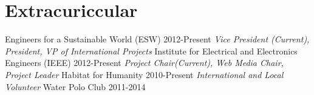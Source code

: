 \documentclass[]{friggeri-cv} %
\begin{document}
\vspace{-8pt}
\section{Extracuriccular}

\begin{entrylist}
\entry
{Engineers for a Sustainable World (ESW)}
{2012-Present}
{}
{\emph{Vice President (Current), President, VP of International Projects}}
{}
\entry
{Institute for Electrical and Electronics Engineers  (IEEE)}
{2012-Present}
{}
{\emph{Project Chair(Current), Web Media Chair, Project Leader}}
{}
\entry
{Habitat for Humanity}
{2010-Present}
{}
{\emph{International and Local Volunteer}}
{}
\entryFourItem
{Water Polo Club}
{2011-2014}
{}
{\emph{}}

\end{entrylist}
\vspace{-8pt}
\vspace{-8pt}
\end{document}
